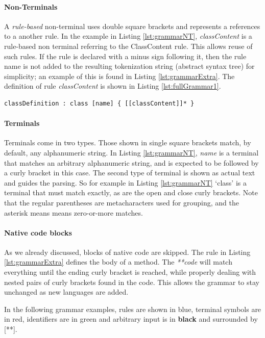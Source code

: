\paragraph*{Non-Terminals} A \textit{rule-based} non-terminal uses double square brackets and represents a references to a another rule. In the example in Listing \ref{lst:grammarNT}, \textit{classContent} is a rule-based non terminal referring to the ClassContent rule. This allows reuse of such rules.  If the rule is declared with a minus sign following it, then the rule name is not added to the resulting tokenization string (abstract syntax tree) for simplicity; an example of this is found in Listing \ref{lst:grammarExtra}. The definition of rule \textit{classContent} is shown in Listing \ref{lst:fullGrammar1}.


\begin{lstlisting}[language={grammar}, label=lst:grammarNT,caption=Grammar for Umple classes]
 classDefinition : class [name] { [[classContent]]* }
\end{lstlisting}

\paragraph*{Terminals} Terminals come in two types. Those shown in single square brackets match, by default, any alphanumeric string. In Listing \ref{lst:grammarNT}, \textit{name} is a terminal that matches an arbitrary alphanumeric string, and is expected to be followed by a curly bracket in this case. The second type of terminal is shown as actual text and guides the parsing. So for example in Listing \ref{lst:grammarNT} `class' is a terminal that must match exactly, as are the open and close curly brackets. Note that the regular parentheses are metacharacters used for grouping, and the asterisk means means zero-or-more matches.

\paragraph*{Native code blocks}
As we already discussed, blocks of native code are skipped. The rule in Listing \ref{lst:grammarExtra} defines the body of a method. The \textit{**code}  will match everything until the ending curly bracket is reached, while properly dealing with nested pairs of curly brackets found in the code. This allows the grammar to stay unchanged as new languages are added. 

In the following grammar examples, {\color{variableBlue}rules} are shown in blue, {\color{keywordRed}terminal} symbols are in red, {\color{stringGreen}identifiers} are in green and arbitrary input is in \textbf{black} and surrounded by [**]. 

